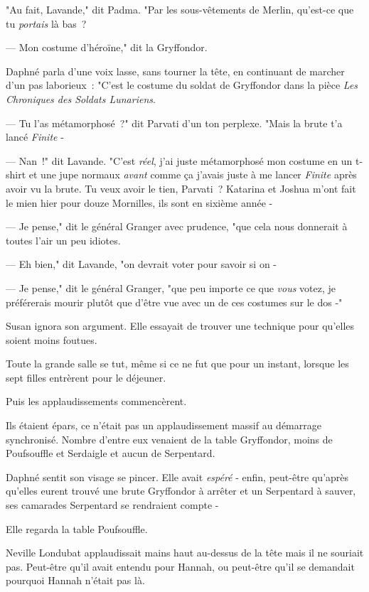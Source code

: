 "Au fait, Lavande," dit Padma. "Par les sous-vêtements de Merlin, qu'est-ce que tu \emph{portais} là bas~?

--- Mon costume d'héroïne," dit la Gryffondor.

Daphné parla d'une voix lasse, sans tourner la tête, en continuant de marcher d'un pas laborieux~: "C'est le costume du soldat de Gryffondor dans la pièce \emph{Les Chroniques des Soldats Lunariens}.

--- Tu l'as métamorphosé~?" dit Parvati d'un ton perplexe. "Mais la brute t'a lancé \emph{Finite} -

--- Nan~!" dit Lavande. "C'est \emph{réel}, j'ai juste métamorphosé mon costume en un t-shirt et une jupe normaux \emph{avant} comme ça j'avais juste à me lancer \emph{Finite} après avoir vu la brute. Tu veux avoir le tien, Parvati~? Katarina et Joshua m'ont fait le mien hier pour douze Mornilles, ils sont en sixième année -

--- Je pense," dit le général Granger avec prudence, "que cela nous donnerait à toutes l'air un peu idiotes.

--- Eh bien," dit Lavande, "on devrait voter pour savoir si on -

--- Je pense," dit le général Granger, "que peu importe ce que \emph{vous} votez, je préférerais mourir plutôt que d'être vue avec un de ces costumes sur le dos -"

Susan ignora son argument. Elle essayait de trouver une technique pour qu'elles soient moins foutues.

\later

Toute la grande salle se tut, même si ce ne fut que pour un instant, lorsque les sept filles entrèrent pour le déjeuner.

Puis les applaudissements commencèrent.

Ils étaient épars, ce n'était pas un applaudissement massif au démarrage synchronisé. Nombre d'entre eux venaient de la table Gryffondor, moins de Poufsouffle et Serdaigle et aucun de Serpentard.

Daphné sentit son visage se pincer. Elle avait \emph{espéré} - enfin, peut-être qu'après qu'elles eurent trouvé une brute Gryffondor à arrêter et un Serpentard à sauver, ses camarades Serpentard se rendraient compte -

Elle regarda la table Poufsouffle.

Neville Londubat applaudissait mains haut au-dessus de la tête mais il ne souriait pas. Peut-être qu'il avait entendu pour Hannah, ou peut-être qu'il se demandait pourquoi Hannah n'était pas là.

